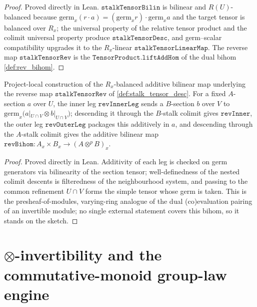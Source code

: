 \begin{proof}
  Proved directly in Lean. \(\mathtt{stalkTensorBilin}\) is bilinear and
  \(R(U)\)-balanced because \(\mathrm{germ}_x(r\cdot a) = (\mathrm{germ}_x r)\cdot
  \mathrm{germ}_x a\) and the target tensor is balanced over \(R_x\); the universal
  property of the relative tensor product and the colimit universal property produce
  \(\mathtt{stalkTensorDesc}\), and germ--scalar compatibility upgrades it to the
  \(R_x\)-linear \(\mathtt{stalkTensorLinearMap}\). The reverse map
  \(\mathtt{stalkTensorRev}\) is the \(\mathtt{TensorProduct.liftAddHom}\) of the dual
  bihom \cref{def:rev_bihom}.
\end{proof}

\begin{definition}
  \label{def:rev_bihom}
  Project-local construction of the \(R_x\)-balanced additive bilinear map underlying the
  reverse map \(\mathtt{stalkTensorRev}\) of \cref{def:stalk_tensor_desc}. For a fixed
  \(A\)-section \(a\) over \(U\), the inner leg \(\mathtt{revInnerLeg}\) sends a
  \(B\)-section \(b\) over \(V\) to \(\mathrm{germ}_x\bigl(a|_{U\cap V} \otimes
  b|_{U\cap V}\bigr)\); descending it through the \(B\)-stalk colimit gives
  \(\mathtt{revInner}\), the outer leg \(\mathtt{revOuterLeg}\) packages this additively in
  \(a\), and descending through the \(A\)-stalk colimit gives the additive bilinear map
  \(\mathtt{revBihom}\colon A_x \times B_x \to (A \otimes^{p} B)_x\).
\end{definition}
\begin{proof}
  Proved directly in Lean. Additivity of each leg is checked on germ generators via
  bilinearity of the section tensor; well-definedness of the nested colimit descents is
  filteredness of the neighbourhood system, and passing to the common refinement
  \(U\cap V\) forms the simple tensor whose germ is taken. This is the
  presheaf-of-modules, varying-ring analogue of the dual (co)evaluation pairing of an
  invertible module; no single external statement covers this bihom, so it stands on the
  sketch.
\end{proof}

\section{\(\otimes\)-invertibility and the commutative-monoid group-law engine}
\label{sec:tensorobj_invertibility}

